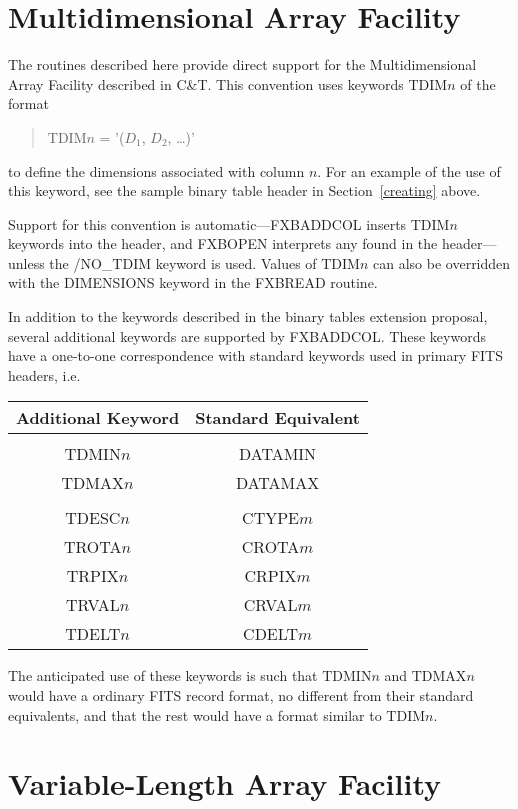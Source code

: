 \section{Multidimensional Array Facility}
\label{tdim}

The routines described here provide direct support for the Multidimensional
Array Facility described in C\&T\@.  This convention uses keywords TDIM$n$ of
the format
\begin{quote}
TDIM$n$ = '($D_1$, $D_2$, \ldots)'
\end{quote}
to define the dimensions associated with column $n$.  For an example of the use
of this keyword, see the sample binary table header in Section~\ref{creating}
above.

Support for this convention is automatic---FXBADDCOL inserts TDIM$n$ keywords
into the header, and FXBOPEN interprets any found in the header---unless the
/NO\_TDIM keyword is used.  Values of TDIM$n$ can also be overridden with the
DIMENSIONS keyword in the FXBREAD routine.

In addition to the keywords described in the binary tables extension proposal,
several additional keywords are supported by FXBADDCOL.  These keywords have a
one-to-one correspondence with standard keywords used in primary FITS headers,
i.e.
\begin{center}
\begin{tabular}{cc}
Additional Keyword	& Standard Equivalent\\
\hline
			&	\\
TDMIN$n$		& DATAMIN \\
TDMAX$n$		& DATAMAX \\
			&	\\
TDESC$n$		& CTYPE$m$ \\
TROTA$n$		& CROTA$m$ \\
TRPIX$n$		& CRPIX$m$ \\
TRVAL$n$		& CRVAL$m$ \\
TDELT$n$		& CDELT$m$ \\
\end{tabular}
\end{center}
The anticipated use of these keywords is such that TDMIN$n$ and TDMAX$n$ would
have a ordinary FITS record format, no different from their standard
equivalents, and that the rest would have a format similar to TDIM$n$.

\section{Variable-Length Array Facility}

